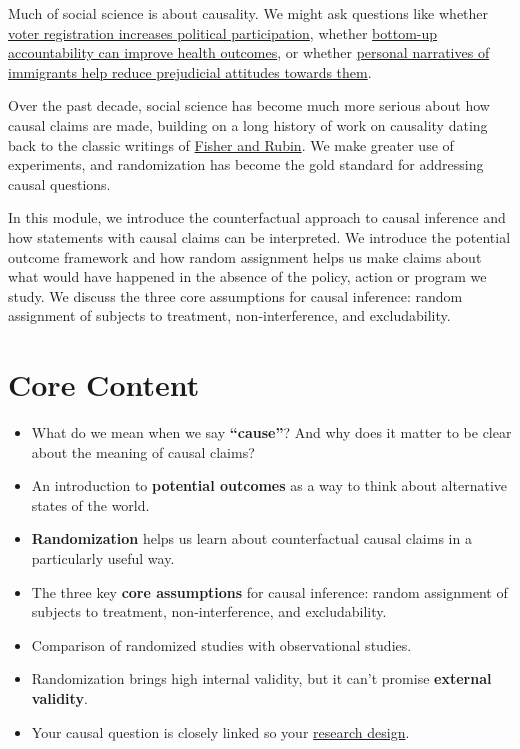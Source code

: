 \documentclass[12pt,]{book}
\begin{document}
Much of social science is about causality. We might ask questions like whether \href{https://egap.org/resource/electoral-administration-in-kenya/}{voter registration increases political participation}, whether \href{https://egap.org/resource/does-bottom-up-accountability-work-evidence-from-uganda/}{bottom-up accountability can improve health outcomes}, or whether \href{https://egap.org/resource/brief-70-how-personal-narratives-reduce-negative-attitudes-towards-immigrants-in-kenya/}{personal narratives of immigrants help reduce prejudicial attitudes towards them}.

Over the past decade, social science has become much more serious about how causal claims are made, building on a long history of work on causality dating back to the classic writings of \protect\hyperlink{causalinference-classics}{Fisher and Rubin}. We make greater use of experiments, and randomization has become the gold standard for addressing causal questions.

In this module, we introduce the counterfactual approach to causal inference and how statements with causal claims can be interpreted. We introduce the potential outcome framework and how random assignment helps us make claims about what would have happened in the absence of the policy, action or program we study. We discuss the three core assumptions for causal inference: random assignment of subjects to treatment, non-interference, and excludability.

\hypertarget{core-content-1}{%
\section{Core Content}\label{core-content-1}}

\begin{itemize}
\item
  What do we mean when we say \textbf{``cause''}? And why does it matter to be clear about the meaning of causal claims?
\item
  An introduction to \textbf{potential outcomes} as a way to think about alternative states of the world.
\item
  \textbf{Randomization} helps us learn about counterfactual causal claims in a particularly useful way.
\item
  The three key \textbf{core assumptions} for causal inference: random assignment of subjects to treatment, non-interference, and excludability.
\item
  Comparison of randomized studies with observational studies.
\item
  Randomization brings high internal validity, but it can't promise \textbf{external validity}.
\item
  Your causal question is closely linked so your \href{the-research-design-process.html}{research design}.
\end{itemize}
\end{document}
